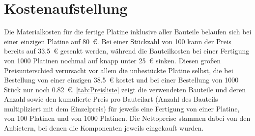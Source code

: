 \section{Kostenaufstellung}
Die Materialkosten für die fertige Platine inklusive aller Bauteile belaufen sich bei einer einzigen Platine auf \SI{80}{\euro}. Bei einer Stückzahl von 100 kann der Preis bereits auf \SI{33,5}{\euro} gesenkt werden, während die Bauteilkosten bei einer Fertigung von 1000 Platinen nochmal auf knapp unter \SI{25}{\euro} sinken. Diesen großen Preisunterschied verursacht vor allem die unbestückte Platine selbst, die bei Bestellung von einer einzigen \SI{38,5}{\euro} kostet und bei einer Bestellung von 1000 Stück nur noch \SI{0,82}{\euro}. \autoref{tab:Preisliste} zeigt die verwendeten Bauteile und deren Anzahl sowie den kumulierte Preis pro Bauteilart (Anzahl des Bauteils multipliziert mit dem Einzelpreis) für jeweils eine Fertigung von einer Platine, von 100 Platinen und von 1000 Platinen. Die Nettopreise stammen dabei von den Anbietern, bei denen die Komponenten jeweils eingekauft wurden.
